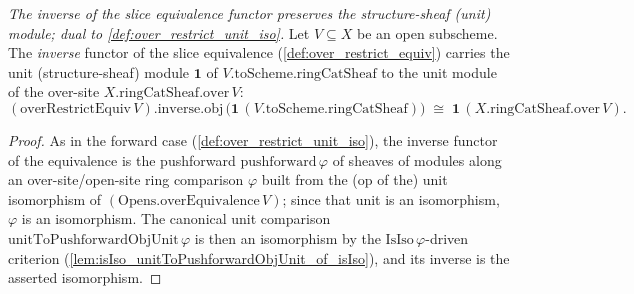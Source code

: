 \begin{definition}
  \label{def:over_restrict_unit_iso_inv}
  \textit{The inverse of the slice equivalence functor preserves the structure-sheaf (unit)
  module; dual to \cref{def:over_restrict_unit_iso}.}
  Let \(V \subseteq X\) be an open subscheme. The \emph{inverse} functor of the slice
  equivalence (\cref{def:over_restrict_equiv}) carries the unit (structure-sheaf) module \(\mathbf{1}\)
  of \(V.\mathrm{toScheme}.\mathrm{ringCatSheaf}\) to the unit module of the over-site
  \(X.\mathrm{ringCatSheaf}.\mathrm{over}\,V\):
  \[
    (\mathrm{overRestrictEquiv}\,V).\mathrm{inverse}.\mathrm{obj}\,
      \bigl(\mathbf{1}\,(V.\mathrm{toScheme}.\mathrm{ringCatSheaf})\bigr)
      \;\cong\; \mathbf{1}\,(X.\mathrm{ringCatSheaf}.\mathrm{over}\,V) .
  \]
\end{definition}
\begin{proof}
  As in the forward case (\cref{def:over_restrict_unit_iso}), the inverse functor of the equivalence is
  the pushforward \(\mathrm{pushforward}\,\varphi\) of sheaves of modules along an over-site/open-site
  ring comparison \(\varphi\) built from the (op of the) unit isomorphism of
  \((\mathrm{Opens.overEquivalence}\,V)\); since that unit is an isomorphism, \(\varphi\) is an
  isomorphism. The canonical unit comparison \(\mathrm{unitToPushforwardObjUnit}\,\varphi\) is then an
  isomorphism by the \(\mathrm{IsIso}\,\varphi\)-driven criterion
  (\cref{lem:isIso_unitToPushforwardObjUnit_of_isIso}), and its inverse is the asserted isomorphism.
\end{proof}

